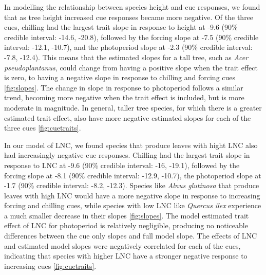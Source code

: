 \documentclass{article}\usepackage[]{graphicx}\usepackage[]{color}
\begin{document}
In modelling the relationship between species height and cue responses, we found that as tree height increased cue responses became more negative. Of the three cues, chilling had the largest trait slope in response to height at -9.6 (90\% credible interval: -14.6, -20.8), followed by the forcing slope at -7.5 (90\% credible interval: -12.1, -10.7), and the photoperiod slope at -2.3 (90\% credible interval: -7.8, -12.4). This means that the estimated slopes for a tall tree, such as \textit{Acer pseudoplantanus}, could change from having a positive slope when the trait effect is zero, to having a negative slope in response to chilling and forcing cues \ref{fig:slopes}. The change in slope in response to photoperiod follows a similar trend, becoming more negative when the trait effect is included, but is more moderate in magnitude. In general, taller tree species, for which there is a greater estimated trait effect,  also have more negative estimated slopes for each of the three cues \ref{fig:cuetraits}. 

In our model of LNC, we found species that produce leaves with hight LNC also had increasingly negative cue responses. Chilling had the largest trait slope in response to LNC at -9.6 (90\% credible interval: -16, -19.1), followed by the forcing slope at -8.1 (90\% credible interval: -12.9, -10.7), the photoperiod slope at -1.7 (90\% credible interval: -8.2, -12.3). Species like \textit{Alnus glutinosa} that produce leaves with high LNC would have a more negative slope in response to increasing forcing and chilling cues, while species with low LNC like \textit{Quercus ilex} experience a much smaller decrease in their slopes \ref{fig:slopes}. The model estimated trait effect of LNC for photoperiod is relatively negligible, producing no noticeable differences between the cue only slopes and full model slope.  The effects of LNC and estimated model slopes were negatively correlated for each of the cues, indicating that species with higher LNC have a stronger negative response to increasing cues \ref{fig:cuetraits}. 
\end{document}
